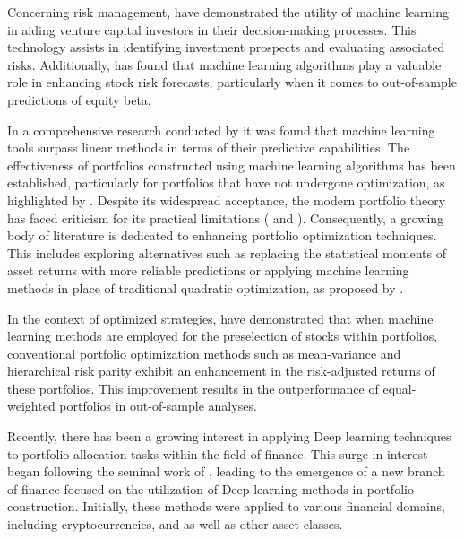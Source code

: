 Concerning risk management, \citep{Arroyo2019124233} have demonstrated the utility of machine learning in aiding venture capital investors in their decision-making processes. This technology assists in identifying investment prospects and evaluating associated risks. Additionally, \citep{Jurczenko2020} has found that machine learning algorithms play a valuable role in enhancing stock risk forecasts, particularly when it comes to out-of-sample predictions of equity beta.

In a comprehensive research conducted by \citep{Gu20202223} it was found that machine learning tools surpass linear methods in terms of their predictive capabilities. The effectiveness of portfolios constructed using machine learning algorithms has been established, particularly for portfolios that have not undergone optimization, as highlighted by \citep{Kaczmarek20211}. Despite its widespread acceptance, the modern portfolio theory has faced criticism for its practical limitations (\citep{Kolm2014356} and \citep{DeMiguel20091915}). Consequently, a growing body of literature is dedicated to enhancing portfolio optimization techniques. This includes exploring alternatives such as replacing the statistical moments of asset returns with more reliable predictions \citep{DeMiguel20091915} or applying machine learning methods in place of traditional quadratic optimization, as proposed by \citep{DePrado201659}.

In the context of optimized strategies, \citep{Kaczmarek20211} have demonstrated that when machine learning methods are employed for the preselection of stocks within portfolios, conventional portfolio optimization methods such as mean-variance and hierarchical risk parity exhibit an enhancement in the risk-adjusted returns of these portfolios. This improvement results in the outperformance of equal-weighted portfolios in out-of-sample analyses.

Recently, there has been a growing interest in applying Deep learning techniques to portfolio allocation tasks within the field of finance. This surge in interest began following the seminal work of \citep{Zhang2019400}, leading to the emergence of a new branch of finance focused on the utilization of Deep learning methods in portfolio construction. Initially, these methods were applied to various financial domains, including cryptocurrencies, and as well as other asset classes.